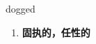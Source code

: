 
\begin{frame}
{\huge dogged}
\begin{center}
\begin{enumerate}\Large
  \item \textbf{固执的，任性的}
\end{enumerate}
\end{center}
\end{frame}
